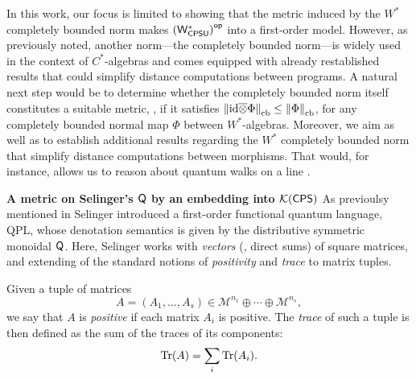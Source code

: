 In this work, our focus is limited to showing that the metric induced by the $W^*$ completely bounded norm makes $\left(\mathsf{W^*_{CPSU}}\right)^{\mathsf{op}}$ into a first-order model. However, as previously noted, another norm---the completely bounded norm---is widely used in the context of $C^*$-algebras and comes equipped with already restablished results that could simplify distance computations between programs.  A natural next step would be to determine whether the completely bounded norm itself constitutes a suitable metric, \ie, if it satisfies $\left\lVert \mathrm{id} \overline{\otimes} \Phi \right\rVert_{\text{cb}} \leq \left\lVert \Phi \right\rVert_{\text{cb}}$, for any completely bounded normal map $\Phi$ between $W^*$-algebras. Moreover, we aim as well as to establish additional results regarding the $W^*$ completely bounded norm that simplify distance computations between morphisms. That would, for instance, allows us to reason about quantum walks on a line \cite{venegasQuantumWalksComprehensive2012}.

\textbf{A metric on Selinger's $\mathsf{Q}$ by an embedding into $\mathcal{K}(\mathsf{CPS})$}
As previoulsy mentioned  in \cite{selinger2004towards} Selinger introduced a first-order functional quantum language, QPL, whose denotation semantics is given by the distributive symmetric monoidal $\mathsf{Q}$.  Here, Selinger works with \emph{vectors} (\ie, direct sums) of square matrices, and extending of the standard notions of \emph{positivity} and \emph{trace} to matrix tuples.

Given a tuple of matrices 
\[
A = (A_1, \ldots, A_s) \in \mathcal{M}^{n_1} \oplus \cdots \oplus \mathcal{M}^{n_s},
\]
we say that $A$ is \emph{positive} if each matrix $A_i$ is positive. The \emph{trace} of such a tuple is then defined as the sum of the traces of its components:
\[
\text{Tr}(A) = \sum_i \text{Tr}(A_i).
\]

